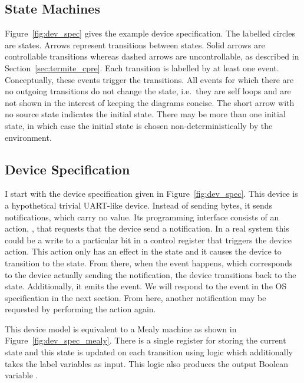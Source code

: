 \subsection{State Machines}

Figure~\ref{fig:dev_spec} gives the example device specification. The labelled circles are states. Arrows represent transitions between states. Solid arrows are controllable transitions whereas dashed arrows are uncontrollable, as described in Section~\ref{sec:termite_cpre}. Each transition is labelled by at least one event. Conceptually, these events trigger the transitions. All events for which there are no outgoing transitions do not change the state, i.e.\ they are self loops and are not shown in the interest of keeping the diagrams concise. The short arrow with no source state indicates the initial state. There may be more than one initial state, in which case the initial state is chosen non-deterministically by the environment.

\subsection{Device Specification}

I start with the device specification given in Figure~\ref{fig:dev_spec}. This device is a hypothetical trivial UART-like device. Instead of sending bytes, it sends notifications, which carry no value. Its programming interface consists of an action, , that requests that the device send a notification. In a real system this could be a write to a particular bit in a control register that triggers the device action. This action only has an effect in the  state and it causes the device to transition to the  state. From there, when the  event happens, which corresponds to the device actually sending the notification, the device transitions back to the  state. Additionally, it emits the  event. We will respond to the  event in the OS specification in the next section. From here, another notification may be requested by performing the  action again.

This device model is equivalent to a Mealy machine as shown in Figure~\ref{fig:dev_spec_mealy}. There is a single register for storing the current state and this state is updated on each transition using logic which additionally takes the label variables as input. This logic also produces the output Boolean variable .

